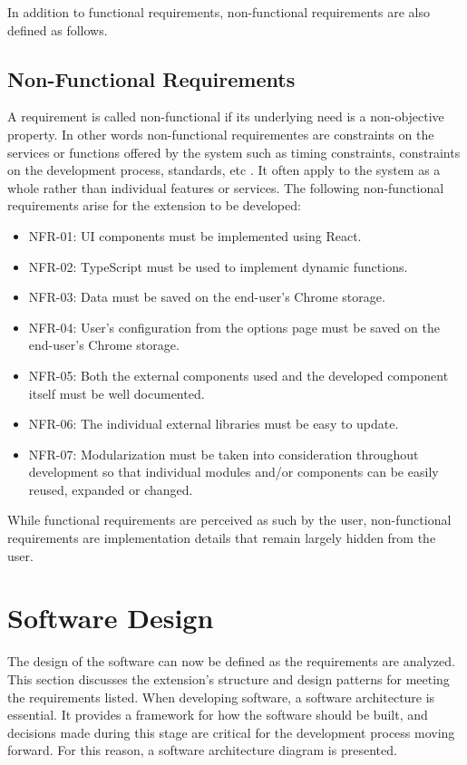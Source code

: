 In addition to functional requirements, non-functional requirements are also defined as follows.

\subsection{Non-Functional Requirements}
A requirement is called non-functional if its underlying need is a non-objective property. In other words non-functional requirementes are constraints on the services or functions offered by the system such as timing constraints, constraints on the development process, standards, etc \autocite{sommerville2011software}. It often apply to the system as a whole rather than individual features or services. The following non-functional requirements arise for the extension to be developed:

\begin{itemize}
  \item NFR-01: UI components must be implemented using React.
  \item NFR-02: TypeScript must be used to implement dynamic functions.
  \item NFR-03: Data must be saved on the end-user's Chrome storage.
  \item NFR-04: User's configuration from the options page must be saved on the end-user's Chrome storage.
  \item NFR-05: Both the external components used and the developed component itself must be well documented.
  \item NFR-06: The individual external libraries must be easy to update.
  \item NFR-07: Modularization must be taken into consideration throughout development so that individual modules and/or components can be easily reused, expanded or changed.
\end{itemize}

While functional requirements are perceived as such by the user, non-functional requirements are implementation details that remain largely hidden from the user.

\section{Software Design}
The design of the software can now be defined as the requirements are analyzed. This section discusses the extension's structure and design patterns for meeting the requirements listed. When developing software, a software architecture is essential. It provides a framework for how the software should be built, and decisions made during this stage are critical for the development process moving forward. For this reason, a software architecture diagram is presented.

